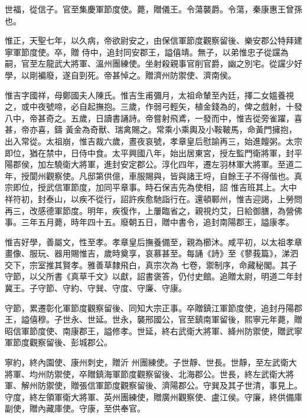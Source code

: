 \begin{pinyinscope}
 世福，從信子。官至集慶軍節度使。薨，贈儀王。令蕩襲爵。令蕩，秦康惠王曾孫也。



 惟正，天聖七年，以久病，帝欲尉安之，由保信軍節度觀察留後、樂安郡公特拜建寧軍節度使。卒，贈
 侍中，追封同安郡王，謚僖靖。無子，以弟惟忠子從讜為嗣，官至左龍武大將軍、溫州團練使。坐射殺親事官削官爵，幽之別宅。從讜少好學，以剛褊廢，遂自剄死。帝甚悼之。贈濟州防禦使、濟南侯。



 惟吉字國祥，母鄭國夫人陳氏。惟吉生甫彌月，太祖命輦至內廷，擇二女媼養視之，或中夜號啼，必自起撫抱。三歲，作弱弓輕矢，植金錢為的，俾之戲射，十發八中，帝甚奇之。五歲，日讀書誦詩。帝嘗射飛鳶，一發而中，惟吉從旁雀躍，喜甚，帝亦喜，鑄
 黃金為奇獸、瑞禽賜之。常乘小乘輿及小鞍鞁馬，命黃門擁抱，出入常從。太祖崩，惟吉裁六歲，晝夜哀號，孝章皇后慰諭再三，始進饘粥。太宗即位，猶在禁中，日侍中食。太平興國八年，始出居東宮，授左監門衛將軍，封平陽郡侯，加左驍衛大將軍，進封安定郡公。淳化四年，遷左羽林軍大將軍。至道二年，授閬州觀察使。凡邸第供億，車服賜與，皆與諸王埒，自餘王子不得偕也。真宗即位，授武信軍節度，加同平章事。時石保吉先為使相，詔
 惟吉班其上。大中祥符初，封泰山，以疾不從行，詔許疾愈馳詣行在。還頓鄆州，惟吉迎謁，上勞問再三，改感德軍節度。明年，疾復作，上屢臨省之，親視灼艾，日給御膳，為營佛事。三年五月薨，時年四十五。廢朝五日，贈中書令，追封南陽郡王，謚康孝。



 惟吉好學，善屬文，性至孝。孝章皇后撫養備至，親為櫛沐。咸平初，以太祖孝章畫像、服玩、器用賜惟吉，歲時奠享，哀慕甚至。每誦《詩》至《蓼莪篇》，涕泗交下，宗室推其賢孝。雅善草隸飛白，真宗次為
 七卷，禦制序，命藏秘閣。其子守節，以父所書《真草千文》以獻，詔書褒答，仍付史館。追贈太尉，明道二年封冀王。子守節、守約、守巽、守度、守廉、守康。



 守節，累遷彰化軍節度觀察留後、同知大宗正事。卒贈鎮江軍節度使，追封丹陽郡王，謚僖穆。子世永、世延。世永，襲邢國公，官至鎮南軍留後，熙寧元年薨，贈昭信軍節度使、南康郡王，謚修孝。世延，終右武衛大將軍、絳州防禦使，贈武寧軍節度觀察留後、彭城郡公。



 寧約，終內園使、康州刺史，贈沂
 州團練使。子世靜、世長。世靜，至左武衛大將軍、均州防禦使，卒贈鎮海軍節度觀察留後、北海郡公。世長，終左武衛大將軍、解州防禦使，贈張信軍節度觀察留後、濟陽郡公。守巽及其子世清，事見上。守度，終左領軍衛大將軍、英州團練使，贈廣州觀察使、盧江侯。守廉，終供備庫副使，贈內藏庫使。守康，至供奉官。




\end{pinyinscope}
